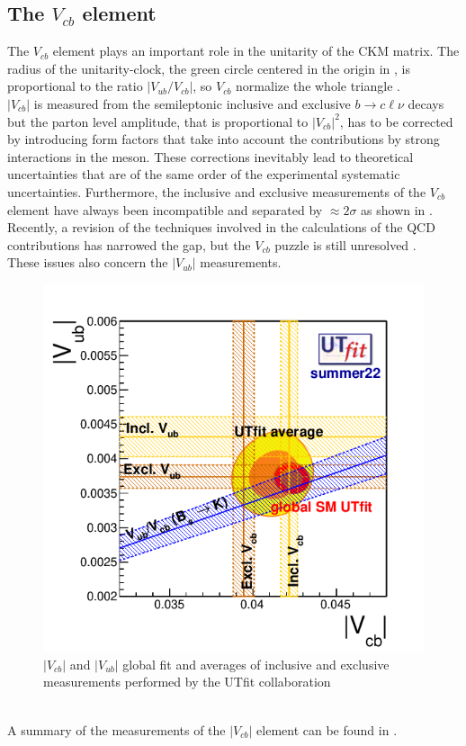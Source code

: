 \subsection{The $V_{cb}$ element}
The $V_{cb}$ element plays an important role in the unitarity of the CKM matrix. The radius of the unitarity-clock, the green circle centered in the origin in , is proportional to the ratio $|V_{ub}/V_{cb}|$, so $V_{cb}$ normalize the whole triangle \cite{Ricciardi2019DeterminationV_cb}.\\
$|V_{cb}|$ is measured from the semileptonic inclusive and exclusive $b \to c\ell\nu$
decays but the parton level amplitude, that is proportional to $|V_{cb}|^2$, has to be corrected by introducing form factors that take into account the contributions by strong interactions in the meson. These corrections inevitably lead to theoretical uncertainties that are of the same order of the experimental systematic uncertainties.
Furthermore, the inclusive and exclusive measurements of the $V_{cb}$ element have always been incompatible and separated by $\approx 2 \sigma$ as shown in . \\
Recently, a revision of the techniques involved in the calculations of the QCD contributions has narrowed the gap, but the $V_{cb}$ puzzle is still unresolved \cite{Bona2023NewScheme}.\\
These issues also concern the $|V_{ub}|$ measurements.
\\
\begin{figure}[h]
    \centering
    \includegraphics[width=0.7\linewidth]{fig//chap02-theory/vubvcb.png}
    \caption{$|V_{cb}|$ and $|V_{ub}|$ global fit and averages of inclusive and exclusive measurements performed by the UTfit collaboration \cite{Bona2023NewScheme}}
    \label{fig:vcbvub}
\end{figure}
\\
A summary of the measurements of the $|V_{cb}|$ element can be found in \cite{PDG_2022}.
